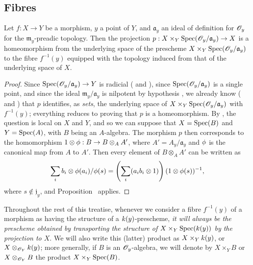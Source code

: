 \subsection{Fibres}
\label{subsection:1.3.6}

\begin{proposition}[3.6.1]
\label{1.3.6.1}
Let $f:X\to Y$ be a morphism, $y$ a point of $Y$, and $\mathfrak{a}_y$ an ideal of definition for $\mathscr{O}_y$ for the $\mathfrak{m}_y$-preadic topology.
Then the projection $p:X\times_Y\Spec(\sh{O}_y/\mathfrak{a}_y)\to X$ is a homeomorphism from the underlying space of the prescheme $X\times_Y\operatorname{Spec}(\mathscr{O}_y/\mathfrak{a}_y)$ to the fibre $f^{-1}(y)$ equipped with the topology induced from that of the underlying space of $X$.
\end{proposition}

\begin{proof}
\label{proof-1.3.6.1}
Since $\Spec(\sh{O}_y/\mathfrak{a}_y)\to Y$ is radicial ( and ), since $\operatorname{Spec}(\mathscr{O}_y/\mathfrak{a}_y)$ is a single point, and since the ideal $\mathfrak{m}_y/\mathfrak{a}_y$ is nilpotent by hypothesis , we already know ( and ) that $p$ identifies, as \emph{sets}, the underlying space of $X\times_Y\operatorname{Spec}(\mathscr{O}_y/\mathfrak{a}_y)$ with $f^{-1}(y)$; everything reduces to proving that $p$ is a homeomorphism.
By , the question is local on $X$ and $Y$, and so we can suppose that $X=\operatorname{Spec}(B)$ and $Y=\operatorname{Spec}(A)$, with $B$ being an $A$-algebra.
The morphism $p$ then corresponds to the homomorphism $1\otimes\vphi:B\to B\otimes_A A'$, where $A'=A_y/\mathfrak{a}_y$ and $\phi$ is the canonical map from $A$ to $A'$.
Then every element of $B\otimes_A A'$ can be written as
\[
  \sum_i b_i\otimes\phi(a_i)/\phi(s)=\left(\sum_i(a_ib_i\otimes1)\right)(1\otimes\phi(s))^{-1},
\]
where $s\not\in\mathfrak{j}_y$, and Proposition~ applies.
\end{proof}

\begin{env}[3.6.2]
\label{1.3.6.2}
Throughout the rest of this treatise, whenever we consider a fibre $f^{-1}(y)$ of a morphism as having the structure of a $k(y)$-prescheme, \emph{it will always be the prescheme obtained by transporting the structure of $X\times_Y\operatorname{Spec}(k(y))$ by the projection to $X$}.
We will also write this (latter) product as $X\times_Yk(y)$, or $X\otimes_{\mathscr{O}_Y}k(y)$; more generally, if $B$ is an $\mathscr{O}_y$-algebra, we will denote by $X\times_Y B$ or $X\otimes_{\mathscr{O}_Y}B$ the product $X\times_Y\operatorname{Spec}(B)$.
\end{env}

